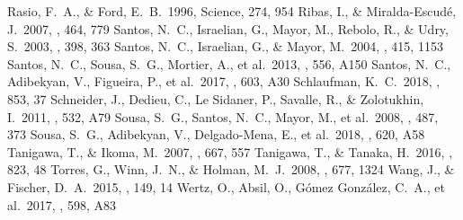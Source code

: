 \documentclass[twocolumn, dvipdfmx]{aastex62}
\begin{document}
\begin{CJK*}{UTF8}{min}
\begin{thebibliography}{}
 Rasio, F.~A., \& Ford, E.~B.\ 1996, Science, 274, 954
 Ribas, I., \& Miralda-Escud{\'e}, J.\ 2007, \aap, 464, 779
 Santos, N.~C., Israelian, G., Mayor, M., Rebolo, R., \& Udry, S.\ 2003, \aap, 398, 363
 Santos, N.~C., Israelian, G., \& Mayor, M.\ 2004, \aap, 415, 1153
 Santos, N.~C., Sousa, S.~G., Mortier, A., et al.\ 2013, \aap, 556, A150
 Santos, N.~C., Adibekyan, V., Figueira, P., et al.\ 2017, \aap, 603, A30
 Schlaufman, K.~C.\ 2018, \apj, 853, 37
 Schneider, J., Dedieu, C., Le Sidaner, P., Savalle, R., \& Zolotukhin, I.\ 2011, \aap, 532, A79
 Sousa, S.~G., Santos, N.~C., Mayor, M., et al.\ 2008, \aap, 487, 373
 Sousa, S.~G., Adibekyan, V., Delgado-Mena, E., et al.\ 2018, \aap, 620, A58
 Tanigawa, T., \& Ikoma, M.\ 2007, \apj, 667, 557
 Tanigawa, T., \& Tanaka, H.\ 2016, \apj, 823, 48
 Torres, G., Winn, J.~N., \& Holman, M.~J.\ 2008, \apj, 677, 1324
 Wang, J., \& Fischer, D.~A.\ 2015, \aj, 149, 14
 Wertz, O., Absil, O., G{\'o}mez Gonz{\'a}lez, C.~A., et al.\ 2017, \aap, 598, A83

\end{thebibliography}





\end{CJK*}
\end{document}
